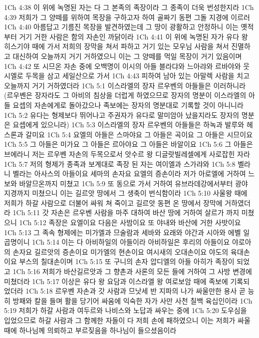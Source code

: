 1Ch 4:38  이 위에 녹명된 자는 다 그 본족의 족장이라 그 종족이 더욱 번성한지라
1Ch 4:39  저희가 그 양떼를 위하여 목장을 구하고자 하여 골짜기 동편 그돌 지경에 이르러
1Ch 4:40  아름답고 기름진 목장을 발견하였는데 그 땅이 광활하고 안정하니 이는 옛적부터 거기 거한 사람은 함의 자손인 까닭이라
1Ch 4:41  이 위에 녹명된 자가 유다 왕 히스기야 때에 가서 저희의 장막을 쳐서 파하고 거기 있는 모우님 사람을 쳐서 진멸하고 대신하여 오늘까지 거기 거하였으니 이는 그 양떼를 먹일 목장이 거기 있음이며
1Ch 4:42  또 시므온 자손 중에 오백명이 이시의 아들 블라댜와 느아랴와 르바야와 웃시엘로 두목을 삼고 세일산으로 가서
1Ch 4:43  피하여 남아 있는 아말렉 사람을 치고 오늘까지 거기 거하였더라
1Ch 5:1  이스라엘의 장자 르우벤의 아들들은 이러하니라 (르우벤은 장자라도 그 아비의 침상을 더럽게 하였으므로 장자의 명분이 이스라엘의 아들 요셉의 자손에게로 돌아갔으나 족보에는 장자의 명분대로 기록할 것이 아니니라
1Ch 5:2  유다는 형제보다 뛰어나고 주권자가 유다로 말미암아 났을지라도 장자의 명분은 요셉에게 있으니라)
1Ch 5:3  이스라엘의 장자 르우벤의 아들들은 하녹과 발루와 헤스론과 갈미요
1Ch 5:4  요엘의 아들은 스마야요 그 아들은 곡이요 그 아들은 시므이요
1Ch 5:5  그 아들은 미가요 그 아들은 르아야요 그 아들은 바알이요
1Ch 5:6  그 아들은 브에라니 저는 르우벤 자손의 두목으로서 앗수르 왕 디글랏빌레셀에게 사로잡힌 자라
1Ch 5:7  저의 형제가 종족과 보계대로 족장 된 자는 여이엘과 스가랴와
1Ch 5:8  벨라니 벨라는 아사스의 아들이요 세마의 손자요 요엘의 증손이라 저가 아로엘에 거하여 느보와 바알므온까지 미쳤고
1Ch 5:9  또 동으로 가서 거하여 유브라데강에서부터 광야 지경까지 미쳤으니 이는 길르앗 땅에서 그 생축이 번식함이라
1Ch 5:10  사울왕 때에 저희가 하갈 사람으로 더불어 싸워 쳐 죽이고 길르앗 동편 온 땅에서 장막에 거하였더라
1Ch 5:11  갓 자손은 르우벤 사람을 마주 대하여 바산 땅에 거하여 살르가 까지 미쳤으니
1Ch 5:12  족장은 요엘이요 다음은 사밤이요 또 야내와 바산에 거한 사밧이요
1Ch 5:13  그 족속 형제에는 미가엘과 므술람과 세바와 요래와 야간과 시아와 에벨 일곱명이니
1Ch 5:14  이는 다 아비하일의 아들이라 아비하일은 후리의 아들이요 야로아의 손자요 길르앗의 증손이요 미가엘의 현손이요 여시새의 오대손이요 야도의 육대손이요 부스의 칠대손이며
1Ch 5:15  또 구니의 손자 압디엘의 아들 아히가 족장이 되었고
1Ch 5:16  저희가 바산길르앗과 그 향촌과 사론의 모든 들에 거하여 그 사방 변경에 미쳤더라
1Ch 5:17  이상은 유다 왕 요담과 이스라엘 왕 여로보암 때에 족보에 기록되었더라
1Ch 5:18  르우벤 자손과 갓 사람과 므낫세 반 지파의 나가 싸울만한 용사 곧 능히 방패와 칼을 들며 활을 당기어 싸움에 익숙한 자가 사만 사천 칠백 육십인이라
1Ch 5:19  저희가 하갈 사람과 여두르와 나비스와 노답과 싸우는 중에
1Ch 5:20  도우심을 입었으므로 하갈 사람과 그 함께한 자들이 다 저희 손에 패하였으니 이는 저희가 싸울 때에 하나님께 의뢰하고 부르짖음을 하나님이 들으셨음이라
